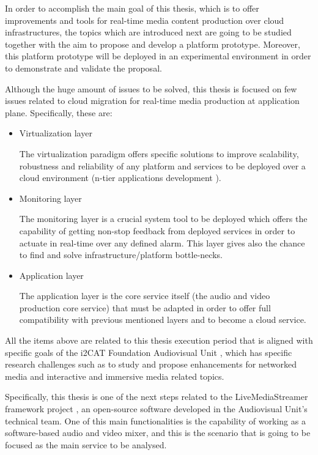In order to accomplish the main goal of this thesis, which is to offer improvements and tools for real-time media content production over cloud infrastructures, the topics which are introduced next are going to be studied together with the aim to propose and develop a platform prototype. Moreover, this platform prototype will be deployed in an experimental environment in order to demonstrate and validate the proposal.

Although the huge amount of issues to be solved, this thesis is focused on few issues related to cloud migration for real-time media production at application plane. Specifically, these are:

\begin{itemize}
\item Virtualization layer \hfill 

The virtualization paradigm offers specific solutions to improve scalability, robustness and reliability of any platform and services to be deployed over a cloud environment (n-tier applications development \cite{n-tier architecture}). 

\item Monitoring layer \hfill 

The monitoring layer is a crucial system tool to be deployed which offers the capability of getting non-stop feedback from deployed services in order to actuate in real-time over any defined alarm. This layer gives also the chance to find and solve infrastructure/platform bottle-necks.

\item Application layer \hfill 

The application layer is the core service itself (the audio and video production core service) that must be adapted in order to offer full compatibility with previous mentioned layers and to become a cloud service.

\end{itemize}

All the items above are related to this thesis execution period that is aligned with specific goals of the i2CAT Foundation Audiovisual Unit \cite{i2catua}, which has specific research challenges such as to study and propose enhancements for networked media and interactive and immersive media related topics. 

Specifically, this thesis is one of the next steps related to the LiveMediaStreamer framework project \cite{lmsGITHUB}, an open-source software developed in the Audiovisual Unit's technical team. One of this main functionalities is the capability of working as a software-based audio and video mixer, and this is the scenario that is going to be focused as the main service to be analysed.


